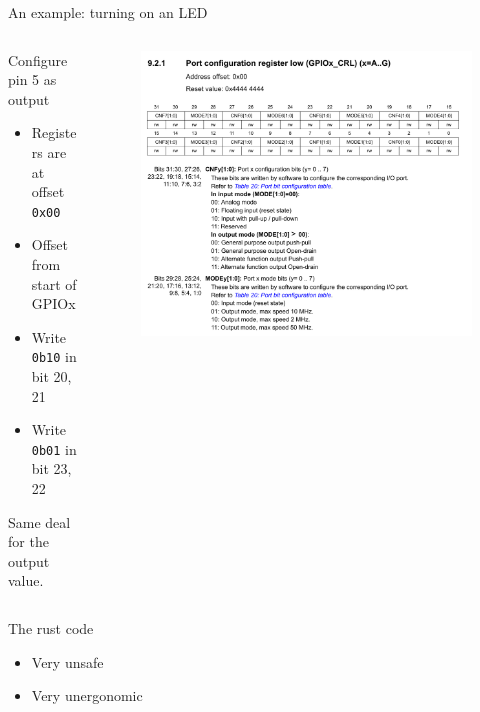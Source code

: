 \documentclass[169]{beamer}
\begin{document}
\begin{frame}{An example: turning on an LED}
    \begin{columns}
        \begin{column}{0.5\textwidth}
            Configure pin 5 as output

            \begin{itemize}
                \item{Registers are at offset \texttt{0x00}}
                \item{Offset from start of GPIOx}
                \item{Write \texttt{0b10} in bit 20, 21}
                \item{Write \texttt{0b01} in bit 23, 22}
            \end{itemize}

            Same deal for the output value.
        \end{column}
        \begin{column}{0.5\textwidth}
            \begin{figure}
                \includegraphics[width=\textwidth]{fig/gpio_crl.png}
            \end{figure}
        \end{column}
    \end{columns}
\end{frame}

\begin{frame}{The rust code}
    \begin{itemize}
        \item Very unsafe
        \item Very unergonomic
    \end{itemize}
\end{frame}
\end{document}
